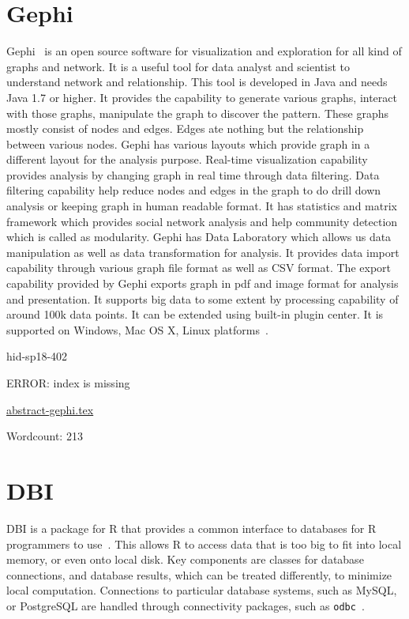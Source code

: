 \section{Gephi}
Gephi~\cite{hid-sp18-402-gephi} is an open source software for
visualization and exploration for all kind of graphs and network. It
is a useful tool for data analyst and scientist to understand network
and relationship. This tool is developed in Java and needs Java 1.7 or
higher. It provides the capability to generate various graphs, interact
with those graphs, manipulate the graph to discover the pattern. These
graphs mostly consist of nodes and edges. Edges ate nothing but the
relationship between various nodes. Gephi has various layouts which
provide graph in a different layout for the analysis purpose. Real-time
visualization capability provides analysis by changing graph in real
time through data filtering. Data filtering capability help reduce
nodes and edges in the graph to do drill down analysis or keeping
graph in human readable format.  It has statistics and matrix framework
which provides social network analysis and help community detection
which is called as modularity. Gephi has Data Laboratory which allows us data manipulation as
well as data transformation for analysis. It provides data import
capability through various graph file format as well as CSV format. The export
capability provided by Gephi exports graph in pdf and image format for
analysis and presentation. It supports big data to some extent by
processing capability of around 100k data points. It can be extended
using built-in plugin center. It is supported on Windows, Mac OS X,
Linux platforms~\cite{hid-sp18-402-gephiF}.


\begin{IU}

hid-sp18-402

ERROR: index is missing

\href{https://github.com/cloudmesh-community/hid-sp18-402/blob/master//technology/abstract-gephi.tex}{abstract-gephi.tex}

 

Wordcount: 213

\end{IU}

\section{DBI}

DBI is a package for R that provides a common interface to databases
for R programmers to use~\cite{hid-sp18-403-R-dbi}. This allows
R to access data that is too big to fit into local memory, or even
onto local disk. Key components are classes for database connections,
and database results, which can be treated differently, to minimize
local computation. Connections to particular database systems, such as
MySQL, or PostgreSQL are handled through connectivity packages, such
as \texttt{odbc}~\cite{hid-sp18-403-rstudio-odbc}.


